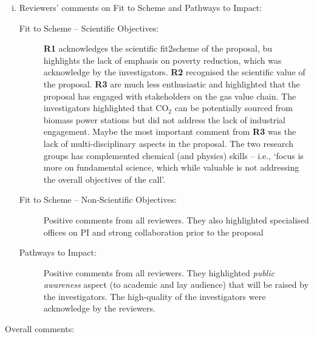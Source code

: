 \documentclass[14pt,twoside]{report}
\begin{document}
\begin{enumerate}[(i)]
\begin{description}
       \end{description}
%
     \item Reviewers' comments on Fit to Scheme and Pathways to Impact:
%

       \begin{description}
          \item[Fit to Scheme -- Scientific Objectives:] {\bf R1} acknowledges the scientific fit2scheme of the proposal, bu highlights the lack of emphasis on poverty reduction, which was acknowledge by the investigators. {\bf R2} recognised the scientific value of the proposal. {\bf R3} are much less enthusiastic and highlighted that the proposal has engaged with stakeholders on the gas value chain. The investigators highlighted that CO$_{2}$ can be potentially sourced from biomass power stations but did not address the lack of industrial engagement. Maybe the most important comment from {\bf R3} was the lack of multi-disciplinary aspects in the proposal. The two research groups has complemented chemical (and physics) skills -- i.e., `focus is more on fundamental science, which while valuable is not addressing the overall objectives of the call'.
%
          \item[Fit to Scheme -- Non-Scientific Objectives:] Positive comments from all reviewers. They also highlighted specialised offices on PI and strong collaboration prior to the proposal
%
          \item[Pathways to Impact:] Positive comments from all reviewers. They highlighted {\it public awareness} aspect (to academic and lay audience) that will be raised by the investigators. The high-quality of the investigators were acknowledge by the reviewers.
       \end{description}
     
%
\end{enumerate}

     \begin{center}
       {\large Overall comments:}
     \end{center}
\end{document}
